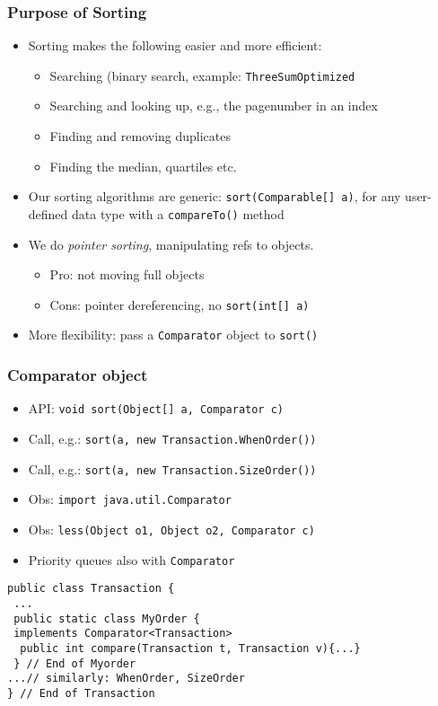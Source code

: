 \documentclass[handout]{beamer}
\begin{document}
\begin{frame}
    \frametitle{Purpose of Sorting}

\begin{itemize}[<+->]
\item Sorting makes the following easier and more efficient:
  \begin{itemize}[<+->]
  \item Searching (binary search, example: {\tt ThreeSumOptimized}
  \item Searching and looking up, e.g., the pagenumber in an index
  \item Finding and removing duplicates
  \item Finding the median, quartiles etc.
  \end{itemize}
\item Our sorting algorithms are generic: {\tt sort(Comparable[] a)},
for any user-defined data type with a {\tt compareTo()} method
\item We do \emph{pointer sorting}, manipulating refs to objects. 
  \begin{itemize}[<+->]
  \item Pro: not moving full objects
  \item Cons: pointer dereferencing, no {\tt sort(int[] a)}
  \end{itemize}
\item More flexibility: pass a {\tt Comparator} object to {\tt sort()}
\end{itemize}     
\end{frame}

\begin{frame}[fragile]
    \frametitle{Comparator object}

\begin{itemize}[<+->]
\item API: {\tt void sort(Object[] a, Comparator c)}
\item Call, e.g.: {\tt sort(a, new Transaction.WhenOrder())}
\item Call, e.g.: {\tt sort(a, new Transaction.SizeOrder())}
\item Obs: {\tt import java.util.Comparator}
\item Obs: {\tt less(Object o1, Object o2, Comparator c)}
\item Priority queues also with {\tt Comparator}
\end{itemize}
\begin{verbatim}
public class Transaction {
 ...
 public static class MyOrder {
 implements Comparator<Transaction>
  public int compare(Transaction t, Transaction v){...}
 } // End of Myorder
...// similarly: WhenOrder, SizeOrder
} // End of Transaction
\end{verbatim}    
\end{frame}
\end{document}
